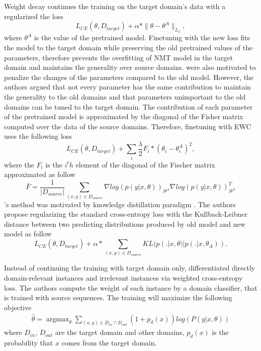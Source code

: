 Weight decay \citep{Miceli17regularization} continues the training on the target domain's data with a regularized the loss 
\begin{equation}
L_{CE}(\theta,\mathit{D}_{target}) + \alpha * \parallel \theta - \theta^{A} \parallel_{L_2},
\end{equation}
where $\theta^{A}$ is the value of the pretrained model. Finetuning with the new loss fits the model to the target domain while preserving the old pretrained values of the parameters, therefore prevents the overfitting of NMT model in the target domain and maintains the generality over source domains. \citet{Brian19overcoming, Kirk16overcoming, Saunders19domain} were also motivated to penalize the changes of the parameters compared to the old model. However, the authors argued that not every parameter has the same contribution to maintain the generality to the old domains and that parameters unimportant to the old domains can be tuned to the target domain. The contribution of each parameter of the pretrained model is approximated by the diagonal of the Fisher matrix computed over the data of the source domains. Therefore, finetuning with EWC uses the following loss
\begin{equation}
L_{CE}(\theta,\mathit{D}_{target}) + \sum_{i} \frac{\lambda}{2} F_i * (\theta_i - \theta_i^{A})^2,
\end{equation}
where the $F_i$ is the $i^th$ element of the diagonal of the Fischer matrix approximated as follow
\begin{equation}
\bar{F} = \frac{1}{|\mathit{D}_{source}|} \displaystyle{\mathop{\sum}_{(x,y)\in \mathit{D}_{source}}} \nabla log(p(y|x,\theta))_{| \theta^{A}} \nabla log(p(y|x,\theta))_{| \theta^{A}}^{T}
\end{equation}
\citet{Dakwle17fine}'s method was motivated by knowledge distillation paradigm \citep{Hinton15Distilling}. The authors propose regularizing the standard cross-entropy loss with the Kullback-Leibner distance \citep{Kullback51On} between two predicting distributions produced by old model and new model as follow
\begin{equation}
L_{CE}(\theta,\mathit{D}_{target}) + \alpha * \displaystyle{\mathop{\sum}_{(x,y)\in \mathit{D}_{source}}} KL(p(.|x,\theta) | p(.|x,\theta_{A})).
\end{equation}

Instead of continuing the training with target domain only, \citet{Chen17cost} differentiated directly domain-relevant instances and irrelevant instances via weighted cross-entropy loss. The authors compute the weight of each instance by a domain classifier, that is trained with source sequences. The training will maximize the following objective 
\begin{equation}
\begin{array}{rcl}
\hat{\theta} = \displaystyle{\mathop{\arg max}_{\theta} \mathop{\sum}_{(x,y)\in D_{in} \cap D_{out}}} (1+p_d(x))log(P(y|x,\theta))
\end{array}
\end{equation}
where $D_{in}$, $D_{out}$ are the target domain and other domains, $p_d(x)$ is the probability that $x$ comes from the target domain. 

